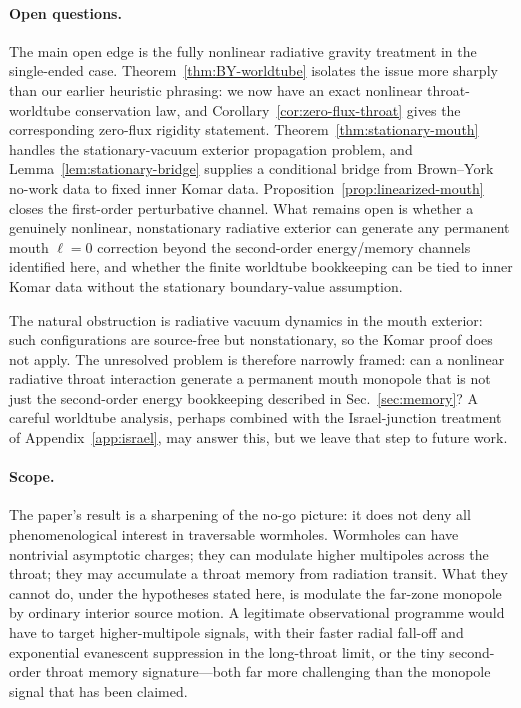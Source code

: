 \documentclass[aps,prd,onecolumn,nofootinbib,superscriptaddress]{revtex4-2}
\begin{document}
\paragraph{Open questions.}
The main open edge is the fully nonlinear radiative gravity treatment in the
single-ended case.  Theorem~\ref{thm:BY-worldtube} isolates the issue more
sharply than our earlier heuristic phrasing: we now have an exact nonlinear
throat-worldtube conservation law, and Corollary~\ref{cor:zero-flux-throat}
gives the corresponding zero-flux rigidity statement.
Theorem~\ref{thm:stationary-mouth} handles the stationary-vacuum exterior propagation
problem, and
Lemma~\ref{lem:stationary-bridge} supplies a conditional bridge from
Brown--York no-work data to fixed inner Komar data.
Proposition~\ref{prop:linearized-mouth} closes the first-order perturbative
channel.  What remains open is whether a genuinely nonlinear, nonstationary
radiative exterior can generate any permanent mouth
$\ell=0$ correction beyond the second-order energy/memory channels identified
here, and whether the finite worldtube bookkeeping can be tied to inner Komar
data without the stationary boundary-value assumption.

The natural obstruction is radiative vacuum dynamics in the mouth exterior:
such configurations are source-free but nonstationary, so the Komar proof does
not apply.  The unresolved problem is therefore narrowly framed: can a
nonlinear radiative throat interaction generate a permanent mouth monopole that
is not just the second-order energy bookkeeping described in Sec.~\ref{sec:memory}?
A careful worldtube analysis, perhaps combined with the Israel-junction treatment of
Appendix~\ref{app:israel}, may answer this, but we leave that step to future
work.

\paragraph{Scope.}
The paper's result is a sharpening of the no-go picture: it does not deny all
phenomenological interest in traversable wormholes.  Wormholes can have
nontrivial asymptotic charges; they can modulate higher multipoles across the
throat; they may accumulate a throat memory from radiation transit.  What they
cannot do, under the hypotheses stated here, is modulate the far-zone monopole
by ordinary interior source motion.  A legitimate observational programme would
have to target higher-multipole signals, with their faster radial fall-off and
exponential evanescent suppression in the long-throat limit, or the tiny
second-order throat memory signature---both far more challenging than the
monopole signal that has been claimed.
\end{document}

